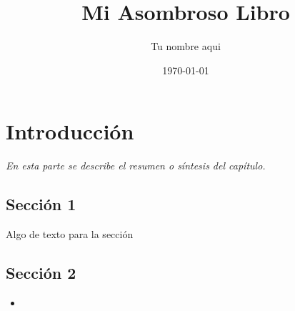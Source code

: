 \documentclass[]{book}
\title{\bf Mi Asombroso Libro}
\author{Tu nombre aqui}
\date{\today}
\begin{document}
\frontmatter
\maketitle
\tableofcontents
\mainmatter
\chapter{Introducción}
\begin{center}
\textit{En esta parte se describe el resumen o síntesis
del capítulo.}
\end{center}
\section{Sección 1}
Algo de texto para la sección
\section{Sección 2}
\begin{itemize}
    \item 
\end{itemize}
\end{document}
